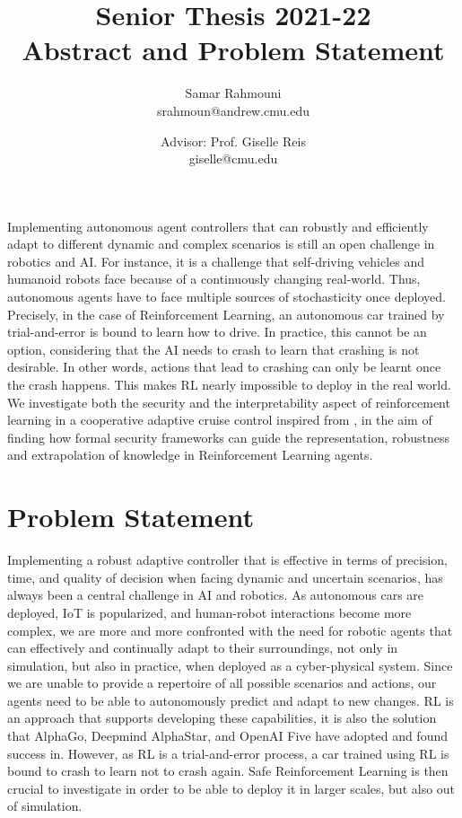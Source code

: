 \documentclass[a4paper,11pt]{article}
\author{%
  \begin{minipage}[t]{0.47\textwidth}
    \centering
    Samar Rahmouni \\ srahmoun@andrew.cmu.edu
  \end{minipage}
  \and
  \begin{minipage}[t]{0.45\textwidth}
    \centering
    Advisor: Prof. Giselle Reis \\ giselle@cmu.edu
  \end{minipage}%
  \vspace*{2ex}
}
\date{}
\title{{\Large\sc Senior Thesis 2021-22\\[2ex]}{\LARGE\bf Abstract and Problem Statement\vspace*{3ex}}}
\begin{document}
\maketitle 


Implementing autonomous agent controllers that can robustly and efficiently adapt to different dynamic
and complex scenarios is still an open challenge in robotics and AI. For instance, it is a challenge that
self-driving vehicles and humanoid robots face because of a continuously changing real-world. Thus, autonomous
agents have to face multiple sources of stochasticity once deployed.
Precisely, in the case of Reinforcement Learning, an autonomous car trained by trial-and-error is bound to learn how to drive. 
In practice, this cannot be an option, considering that the AI needs to crash to learn that crashing is not desirable. In other words, 
actions that lead to crashing can only be learnt once the crash happens. This makes RL nearly impossible to deploy in the real world. 
We investigate both the security and the interpretability aspect of reinforcement learning in a cooperative adaptive cruise control inspired from \cite{vnc20},
in the aim of finding how formal security frameworks can guide the representation, robustness and extrapolation of knowledge in Reinforcement
Learning agents. 

\section{Problem Statement}
Implementing a robust adaptive controller that is effective in terms of precision, time, and quality of decision
when facing dynamic and uncertain scenarios, has always been a central challenge in AI and robotics.
As autonomous cars are deployed, IoT is popularized, and human-robot interactions become more complex, we
are more and more confronted with the need for robotic agents that can effectively and continually adapt
to their surroundings, not only in simulation, but also in practice, when deployed as a cyber-physical system. 
Since we are unable to provide a repertoire of all possible scenarios and actions,
our agents need to be able to autonomously predict and adapt to new changes. RL is an approach that
supports developing these capabilities, it is also the solution that AlphaGo, Deepmind AlphaStar, and OpenAI Five have
adopted \cite{li2019reinforcement} and found success in. 
However, as RL is a trial-and-error process, a car trained using RL is bound to crash to learn not to crash again. Safe Reinforcement Learning is then crucial 
to investigate in order to be able to deploy it in larger scales, but also out of simulation. 
\end{document}
